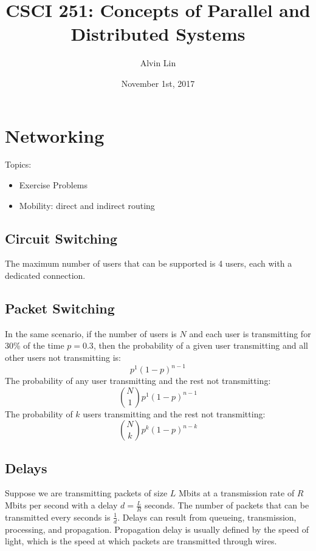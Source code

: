 \documentclass{math}
\title{CSCI 251: Concepts of Parallel and Distributed Systems}
\author{Alvin Lin}
\date{November 1st, 2017}
\begin{document}
\maketitle

\section*{Networking}
Topics:
\begin{itemize}
  \item Exercise Problems
  \item Mobility: direct and indirect routing
\end{itemize}

\subsection*{Circuit Switching}
\begin{center}
\end{center}
The maximum number of users that can be supported is 4 users, each with a
dedicated connection.

\subsection*{Packet Switching}
In the same scenario, if the number of users is \( N \) and each user is
transmitting for 30\% of the time \( p = 0.3 \), then the probability of a
given user transmitting and all other users not transmitting is:
\[ p^1(1-p)^{n-1} \]
The probability of any user transmitting and the rest not transmitting:
\[ \binom{N}{1}p^1(1-p)^{n-1} \]
The probability of \( k \) users transmitting and the rest not transmitting:
\[ \binom{N}{k}p^k(1-p)^{n-k} \]

\subsection*{Delays}
Suppose we are transmitting packets of size \( L \) Mbits at a transmission rate
of \( R \) Mbits per second with a delay \( d = \frac{L}{R} \) seconds. The
number of packets that can be transmitted every seconds is \( \frac{1}{d} \).
Delays can result from queueing, transmission, processing, and propagation.
Propagation delay is usually defined by the speed of light, which is the speed
at which packets are transmitted through wires.
\end{document}
